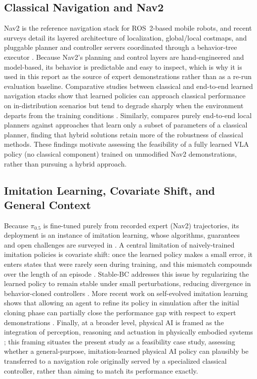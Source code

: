 \documentclass[conference]{IEEEtran}
\begin{document}
\subsection{Classical Navigation and Nav2}
Nav2 is the reference navigation stack for ROS~2-based mobile robots, and recent surveys detail its layered architecture of localization, global/local costmaps, and pluggable planner and controller servers coordinated through a behavior-tree executor \cite{wei2025rosnavigation}. Because Nav2's planning and control layers are hand-engineered and model-based, its behavior is predictable and easy to inspect, which is why it is used in this report as the source of expert demonstrations rather than as a re-run evaluation baseline. Comparative studies between classical and end-to-end learned navigation stacks show that learned policies can approach classical performance on in-distribution scenarios but tend to degrade sharply when the environment departs from the training conditions \cite{gapud2025classicvsete}. Similarly, \cite{xu2021localmotionplanning} compares purely end-to-end local planners against approaches that learn only a subset of parameters of a classical planner, finding that hybrid solutions retain more of the robustness of classical methods. These findings motivate assessing the feasibility of a fully learned VLA policy (no classical component) trained on unmodified Nav2 demonstrations, rather than pursuing a hybrid approach.

\subsection{Imitation Learning, Covariate Shift, and General Context}
Because $\pi_{0.5}$ is fine-tuned purely from recorded expert (Nav2) trajectories, its deployment is an instance of imitation learning, whose algorithms, guarantees and open challenges are surveyed in \cite{zare2023imitationsurvey}. A central limitation of naively-trained imitation policies is covariate shift: once the learned policy makes a small error, it enters states that were rarely seen during training, and this mismatch compounds over the length of an episode \cite{spencer2020feedback}. Stable-BC addresses this issue by regularizing the learned policy to remain stable under small perturbations, reducing divergence in behavior-cloned controllers \cite{mehta2024stablebc}. More recent work on self-evolved imitation learning shows that allowing an agent to refine its policy in simulation after the initial cloning phase can partially close the performance gap with respect to expert demonstrations \cite{ye2026selfevolved}. Finally, at a broader level, physical AI is framed as the integration of perception, reasoning and actuation in physically embodied systems \cite{salehi2025physicalai}; this framing situates the present study as a feasibility case study, assessing whether a general-purpose, imitation-learned physical AI policy can plausibly be transferred to a navigation role originally served by a specialized classical controller, rather than aiming to match its performance exactly.
\end{document}
